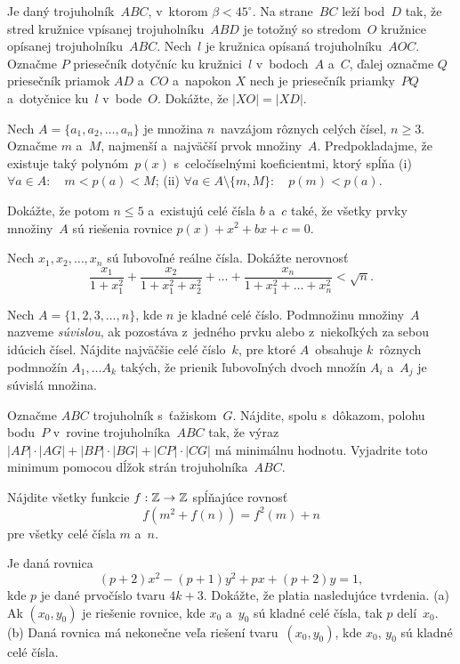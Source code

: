 {%
Je daný trojuholník~$ABC$, v~ktorom $\beta<45^\circ$. Na strane~$BC$ leží bod~$D$ tak,
že stred kružnice vpísanej trojuholníku~$ABD$ je totožný so stredom~$O$ kružnice
opísanej trojuholníku~$ABC$. Nech~$l$ je kružnica opísaná trojuholníku~$AOC$. Označme
$P$ priesečník dotyčníc ku kružnici~$l$ v~bodoch~$A$ a~$C$, ďalej označme $Q$ priesečník
priamok $AD$ a~$CO$ a~napokon $X$ nech je priesečník priamky~$PQ$ a~dotyčnice ku~$l$
v~bode~$O$. Dokážte, že $|XO|=|XD|$.}

{%
Nech $A=\{a_1,a_2,\dots,a_n\}$ je množina $n$~navzájom rôznych celých čísel, $n\ge3$.
Označme $m$ a~$M$, najmenší a~najväčší prvok množiny~$A$. Predpokladajme, že existuje
taký polynóm~$p(x)$ s~celočíselnými koeficientmi, ktorý spĺňa
\ite (i) $\forall a\in A:\quad m<p(a)<M$;
\ite (ii) $\forall a\in A\setminus\{m,M\}:\quad p(m)<p(a)$.

Dokážte, že potom $n\le5$ a~existujú celé čísla $b$ a~$c$ také, že všetky prvky množiny~$A$
sú riešenia rovnice $p(x)+x^2+bx+c=0$.}

{%
Nech $x_1,x_2,\dots,x_n$ sú ľubovoľné reálne čísla. Dokážte nerovnosť
$$
\frac{x_1}{1+x_1^2} + \frac{x_2}{1+x_1^2+x_2^2} + \dots
+ \frac{x_n}{1+x_1^2+\dots+x_n^2} < \sqrt{n}.
$$}

{%
Nech $A=\{1,2,3,\dots,n\}$, kde $n$ je kladné celé číslo. Podmnožinu množiny~$A$ nazveme
{\it súvislou\/}, ak pozostáva z~jedného prvku alebo z~niekoľkých za sebou idúcich čísel.
Nájdite najväčšie celé číslo~$k$, pre ktoré $A$~obsahuje $k$~rôznych podmnožín
$A_1,\dots A_k$ takých, že prienik ľubovoľných dvoch množín $A_i$ a~$A_j$ je súvislá množina.}

{%
Označme $ABC$ trojuholník s~ťažiskom~$G$. Nájdite, spolu s~dôkazom, polohu bodu~$P$ v~rovine
trojuholníka~$ABC$ tak, že výraz $|AP|\cdot|AG|+|BP|\cdot|BG|+|CP|\cdot|CG|$ má minimálnu
hodnotu. Vyjadrite toto minimum pomocou dĺžok strán trojuholníka~$ABC$.}

{%
Nájdite všetky funkcie $f:\Bbb Z\to\Bbb Z$ spĺňajúce rovnosť
$$
f(m^2+f(n))=f^2(m)+n
$$
pre všetky celé čísla $m$ a~$n$.}

{%
Je daná rovnica
$$
(p+2)x^2 - (p+1)y^2 + px + (p+2)y = 1,
$$
kde $p$ je dané prvočíslo tvaru $4k+3$. Dokážte, že platia nasledujúce tvrdenia.
\ite (a) Ak $(x_0,y_0)$ je riešenie rovnice, kde $x_0$ a~$y_0$ sú kladné celé čísla,
tak $p$ delí~$x_0$.
\ite (b) Daná rovnica má nekonečne veľa riešení tvaru~$(x_0,y_0)$, kde $x_0$, $y_0$ sú
kladné celé čísla.}

